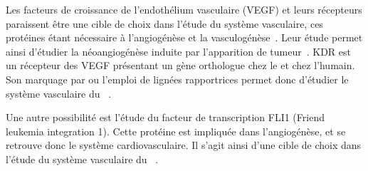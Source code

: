 \documentclass[\main/main.tex]{subfiles}
\begin{document}
Les facteurs de croissance de l'endothélium vasculaire (VEGF) et leurs récepteurs paraissent être une cible de choix dans l'étude du système vasculaire,
ces protéines étant nécessaire à  l'angiogénèse et la vasculogénèse~\cite{bahary_2007}.
%
Leur étude permet ainsi d'étudier la néoangiogénèse induite par l'apparition de tumeur~\cite{nicoli_2007}.
%
KDR est un récepteur des VEGF présentant un gène orthologue chez le \pz{} et chez l'humain.
%
Son marquage par \ihcie{} ou l'emploi de lignées rapportrices permet donc d'étudier le système vasculaire du \pz{}~\cite{savage_2019}.

Une autre possibilité est l'étude du facteur de transcription FLI1 (Friend leukemia integration 1).
%
Cette protéine est impliquée dans l'angiogénèse, et se retrouve donc le système cardiovasculaire.
%
Il s'agit ainsi d'une cible de choix dans l'étude du système vasculaire du \pz{}~\cite{letrado_2018}.
\end{document}
